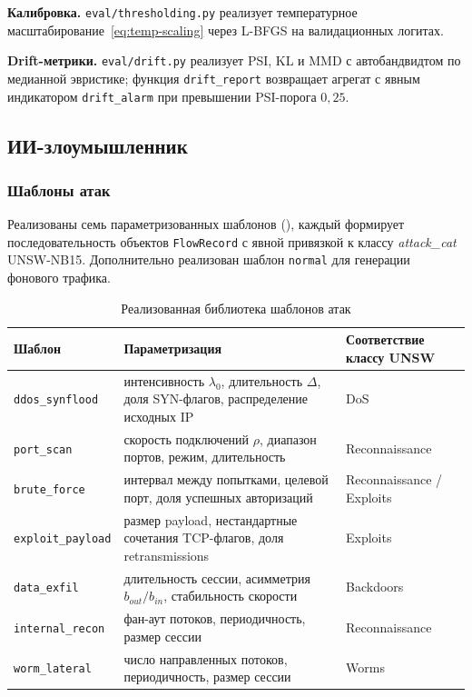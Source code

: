 \textbf{Калибровка.} \texttt{eval/thresholding.py} реализует
температурное масштабирование~\eqref{eq:temp-scaling} через L-BFGS на
валидационных логитах.

\textbf{Drift-метрики.} \texttt{eval/drift.py} реализует PSI, KL и MMD
с автобандвидтом по медианной эвристике; функция
\texttt{drift\_report} возвращает агрегат с явным индикатором
\texttt{drift\_alarm} при превышении PSI-порога \(0{,}25\).

\subsection{ИИ-злоумышленник}

\subsubsection{Шаблоны атак}

Реализованы семь параметризованных шаблонов
(), каждый формирует
последовательность объектов \texttt{FlowRecord} с явной привязкой к
классу \emph{attack\_cat} UNSW-NB15. Дополнительно реализован шаблон
\texttt{normal} для генерации фонового трафика.

\begin{table}[H]
\centering
\caption{Реализованная библиотека шаблонов атак}
\label{tab:attack-templates}
\renewcommand{\arraystretch}{1.2}
\setlength{\tabcolsep}{4pt}
\small
\begin{tabularx}{\linewidth}{@{}lXX@{}}
\toprule
\textbf{Шаблон} & \textbf{Параметризация} & \textbf{Соответствие классу UNSW} \\
\midrule
\texttt{ddos\_synflood} &
интенсивность \(\lambda_0\), длительность \(\Delta\), доля SYN-флагов,
распределение исходных IP &
DoS \\
\addlinespace
\texttt{port\_scan} &
скорость подключений \(\rho\), диапазон портов, режим, длительность &
Reconnaissance \\
\addlinespace
\texttt{brute\_force} &
интервал между попытками, целевой порт, доля успешных авторизаций &
Reconnaissance / Exploits \\
\addlinespace
\texttt{exploit\_payload} &
размер payload, нестандартные сочетания TCP-флагов, доля retransmissions &
Exploits \\
\addlinespace
\texttt{data\_exfil} &
длительность сессии, асимметрия \(b_{out}/b_{in}\), стабильность скорости &
Backdoors \\
\addlinespace
\texttt{internal\_recon} &
фан-аут потоков, периодичность, размер сессии &
Reconnaissance \\
\addlinespace
\texttt{worm\_lateral} &
число направленных потоков, периодичность, размер сессии &
Worms \\
\bottomrule
\end{tabularx}
\end{table}

